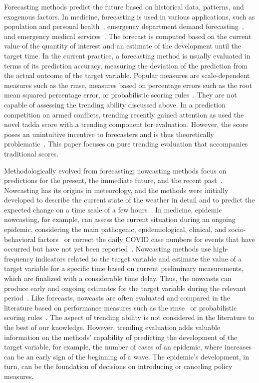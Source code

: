 \documentclass[pdflatex]{sn-jnl}
\theoremstyle{plain}%
\theoremstyle{definition}
\begin{document}
Forecasting methods predict the future based on historical data, patterns, and exogenous factors.
In medicine, forecasting is used in various applications, such as population and personal health~\parencite[see, e.g., the review in][]{Soyiri2013}, emergency department demand forecasting~\parencite{Jones2008,Rostami-Tabar2023}, and emergency medical services~\parencite{HaugsboHermansen2021}.
The forecast is computed based on the current value of the quantity of interest and an estimate of the development until the target time.
In the current practice, a forecasting method is usually evaluated in terms of its prediction accuracy, measuring the deviation of the prediction from the actual outcome of the target variable.
Popular measures are scale-dependent measures such as the \ac{rmse}, measures based on percentage errors such as the root mean squared percentage error, or probabilistic scoring rules~\citep[see the review in][]{hyndman2006another}.
They are not capable of assessing the trending ability discussed above.
In a prediction competition on armed conflicts, trending recently gained attention as \citet{Vesco2022} used the novel \ac{tadda} score with a trending component for evaluation.
However, the score poses an unintuitive incentive to forecasters and is thus theoretically problematic~\parencite{Bracher2023}.
This paper focuses on pure trending evaluation that accompanies traditional scores.

Methodologically evolved from forecasting; nowcasting methods focus on predictions for the present, the immediate future, and the recent past~\citep{banbura2013now}.
Nowcasting has its origins in meteorology, and the methods were initially developed to describe the current state of the weather in detail and to predict the expected change on a time scale of a few hours~\citep{browning1989nowcasting,schmid2019nowcasting}.
In medicine, epidemic nowcasting, for example, can assess the current situation during an ongoing epidemic, considering the main pathogenic, epidemiological, clinical, and socio-behavioral factors~\citep{wu2021nowcasting} or correct the daily COVID case numbers for events that have occurred but have not yet been reported~\citep{gunther2021nowcasting}.
Nowcasting methods use high-frequency indicators related to the target variable and estimate the value of a target variable for a specific time based on current preliminary measurements, which are finalized with a considerable time delay.
Thus, the nowcasts can produce early and ongoing estimates for the target variable during the relevant period~\citep{castle2017forecasting}.
Like forecasts, nowcasts are often evaluated and compared in the literature based on performance measures such as the \ac{rmse}~\citep{gunther2021nowcasting} or probabilistic scoring rules~\citep{Wolffram2023}.
The aspect of trending ability is not considered in the literature to the best of our knowledge.
However, trending evaluation adds valuable information on the methods' capability of predicting the development of the target variable, for example, the number of cases of an epidemic, where increases can be an early sign of the beginning of a wave.
The epidemic's development, in turn, can be the foundation of decisions on introducing or canceling policy measures.
\end{document}
